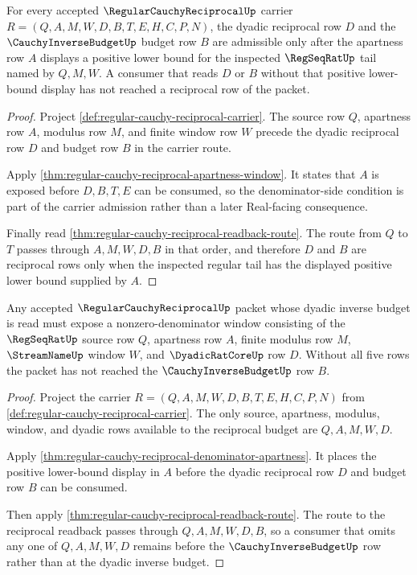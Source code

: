 \begin{theorem}
\label{thm:regular-cauchy-reciprocal-denominator-apartness}
For every accepted $\RegularCauchyReciprocalUp$ carrier $R=(Q,A,M,W,D,B,T,E,H,C,P,N)$, the dyadic reciprocal row $D$ and the $\CauchyInverseBudgetUp$ budget row $B$ are admissible only after the apartness row $A$ displays a positive lower bound for the inspected $\RegSeqRatUp$ tail named by $Q,M,W$. A consumer that reads $D$ or $B$ without that positive lower-bound display has not reached a reciprocal row of the packet.
\end{theorem}
\begin{proof}
Project \autoref{def:regular-cauchy-reciprocal-carrier}. The source row $Q$, apartness row $A$, modulus row $M$, and finite window row $W$ precede the dyadic reciprocal row $D$ and budget row $B$ in the carrier route.

Apply \autoref{thm:regular-cauchy-reciprocal-apartness-window}. It states that $A$ is exposed before $D,B,T,E$ can be consumed, so the denominator-side condition is part of the carrier admission rather than a later Real-facing consequence.

Finally read \autoref{thm:regular-cauchy-reciprocal-readback-route}. The route from $Q$ to $T$ passes through $A,M,W,D,B$ in that order, and therefore $D$ and $B$ are reciprocal rows only when the inspected regular tail has the displayed positive lower bound supplied by $A$.
\end{proof}

\begin{theorem}
\label{thm:regular-cauchy-reciprocal-nonzero-denominator-window}
Any accepted $\RegularCauchyReciprocalUp$ packet whose dyadic inverse budget is read must expose a nonzero-denominator window consisting of the $\RegSeqRatUp$ source row $Q$, apartness row $A$, finite modulus row $M$, $\StreamNameUp$ window $W$, and $\DyadicRatCoreUp$ row $D$. Without all five rows the packet has not reached the $\CauchyInverseBudgetUp$ row $B$.
\end{theorem}
\begin{proof}
Project the carrier $R=(Q,A,M,W,D,B,T,E,H,C,P,N)$ from \autoref{def:regular-cauchy-reciprocal-carrier}. The only source, apartness, modulus, window, and dyadic rows available to the reciprocal budget are $Q,A,M,W,D$.

Apply \autoref{thm:regular-cauchy-reciprocal-denominator-apartness}. It places the positive lower-bound display in $A$ before the dyadic reciprocal row $D$ and budget row $B$ can be consumed.

Then apply \autoref{thm:regular-cauchy-reciprocal-readback-route}. The route to the reciprocal readback passes through $Q,A,M,W,D,B$, so a consumer that omits any one of $Q,A,M,W,D$ remains before the $\CauchyInverseBudgetUp$ row rather than at the dyadic inverse budget.
\end{proof}

